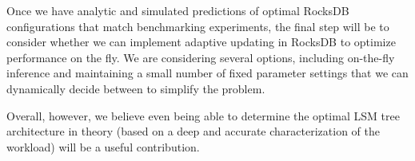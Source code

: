 \documentclass{sig-alternate-05-2015}
\begin{document}
Once we have analytic and simulated predictions of optimal RocksDB
configurations that match benchmarking experiments, the final step will be to
consider whether we can implement adaptive updating in RocksDB to optimize
performance on the fly. We are considering several options, including on-the-fly
inference and maintaining a small number of fixed parameter settings that we can
dynamically decide between to simplify the problem.

Overall, however, we believe even being able to determine the optimal LSM tree
architecture in theory (based on a deep and accurate characterization of the
workload) will be a useful contribution.


\small

\end{document}
